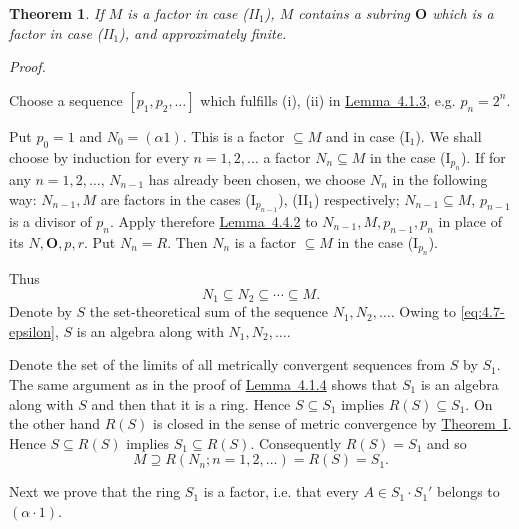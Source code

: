 \documentclass[b5paper,twoside]{article}
\newcommand{\thmref}[2]{\hyperref[#1]{\mbox{Theorem~#2}}}
\newcommand{\lemref}[2]{\hyperref[#1]{\mbox{Lemma~#2}}}
\theoremstyle{mvnplain}
\newtheorem{theorem}{Theorem}
\renewenvironment{proof}[1][Proof]{%
  \par\addvspace{0.35\baselineskip}%
  \noindent\textit{#1.}\ \normalfont\ignorespaces
}{%
  \par\addvspace{0.35\baselineskip}%
}
\newcommand{\M}{\mathbf M}
\newcommand{\N}{\mathbf N}
\newcommand{\R}{\mathbf R}
\def\M{M}%
\def\N{N}%
\def\R{R}%
\begin{document}
\begin{theorem}\label{thm:XIII}
If \(\M\) is a factor in case (II\(_1\)), \(\M\) contains a subring
\(\mathbf O\) which is a factor in case (II\(_1\)), and approximately finite.
\end{theorem}

\begin{proof}
Choose a sequence \([p_1,p_2,\ldots]\) which fulfills (i), (ii) in
\lemref{lem:4.1.3}{4.1.3}, e.g. \(p_n=2^n\).

Put \(p_0=1\) and \(\N_0=(\alpha1)\). This is a factor \(\subseteq\M\) and
in case (I\(_1\)). We shall choose by induction for every
\(n=1,2,\ldots\) a factor \(\N_n\subseteq\M\) in the case
(I\(_{p_n}\)). If for any \(n=1,2,\ldots\), \(\N_{n-1}\) has already
been chosen, we choose \(\N_n\) in the following way: \(\N_{n-1},\M\) are
factors in the cases (I\(_{p_{n-1}}\)), (II\(_1\)) respectively;
\(\N_{n-1}\subseteq\M\), \(p_{n-1}\) is a divisor of \(p_n\). Apply
therefore \lemref{lem:4.4.2}{4.4.2} to \(\N_{n-1},\M,p_{n-1},p_n\) in
place of its \(\N,\mathbf O,p,r\). Put \(\N_n=\R\). Then \(\N_n\) is a
factor \(\subseteq\M\) in the case (I\(_{p_n}\)).

Thus
\begin{equation}\tag{4.7.\(\epsilon\)}\label{eq:4.7-epsilon}
 \N_1\subseteq\N_2\subseteq\cdots\subseteq\M.
\end{equation}
Denote by \(S\) the set-theoretical sum of the sequence
\(\N_1,\N_2,\ldots\). Owing to \eqref{eq:4.7-epsilon}, \(S\) is an
algebra along with \(\N_1,\N_2,\ldots\).

Denote the set of the limits of all metrically convergent sequences from
\(S\) by \(S_1\). The same argument as in the proof of
\lemref{lem:4.1.4}{4.1.4} shows that \(S_1\) is an algebra along with \(S\)
and then that it is a ring. Hence \(S\subseteq S_1\) implies
\(\R(S)\subseteq S_1\). On the other hand \(\R(S)\) is closed in the sense
of metric convergence by \thmref{thm:I}{I}. Hence \(S\subseteq\R(S)\)
implies \(S_1\subseteq\R(S)\). Consequently \(\R(S)=S_1\) and so
\begin{equation}\tag{4.7.\(\zeta\)}\label{eq:4.7-zeta}
 \M\supseteq\R(\N_n;n=1,2,\ldots)=\R(S)=S_1.
\end{equation}

Next we prove that the ring \(S_1\) is a factor, i.e. that every
\(A\in S_1\cdot S_1'\) belongs to \((\alpha\cdot1)\).


\end{proof}
\end{document}
